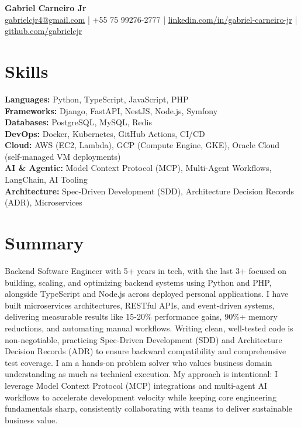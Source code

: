 \documentclass[letterpaper,10pt]{article}
\begin{document}
\begin{center}
    \textbf{\huge Gabriel Carneiro Jr} \\ \vspace{2pt}
    \small
    \href{mailto:gabrielcjr4@gmail.com}{gabrielcjr4@gmail.com} |
    +55 75 99276-2777 |
    \href{https://www.linkedin.com/in/gabriel-carneiro-jr}{linkedin.com/in/gabriel-carneiro-jr} |
    \href{https://github.com/gabrielcjr}{github.com/gabrielcjr}
\end{center}

\section{Skills}
\begin{itemize}[leftmargin=0.15in, label={}]
  \small{\item{
    \textbf{Languages:} Python, TypeScript, JavaScript, PHP \\
    \textbf{Frameworks:} Django, FastAPI, NestJS, Node.js, Symfony \\
    \textbf{Databases:} PostgreSQL, MySQL, Redis \\
    \textbf{DevOps:} Docker, Kubernetes, GitHub Actions, CI/CD \\
    \textbf{Cloud:} AWS (EC2, Lambda), GCP (Compute Engine, GKE), Oracle Cloud (self-managed VM deployments) \\
    \textbf{AI \& Agentic:} Model Context Protocol (MCP), Multi-Agent Workflows, LangChain, AI Tooling \\
    \textbf{Architecture:} Spec-Driven Development (SDD), Architecture Decision Records (ADR), Microservices
  }}
\end{itemize}

\section{Summary}
\small{Backend Software Engineer with 5+ years in tech, with the last 3+ focused on building, scaling, and optimizing backend systems using Python and PHP, alongside TypeScript and Node.js across deployed personal applications. I have built microservices architectures, RESTful APIs, and event-driven systems, delivering measurable results like 15-20\% performance gains, 90\%+ memory reductions, and automating manual workflows. Writing clean, well-tested code is non-negotiable, practicing Spec-Driven Development (SDD) and Architecture Decision Records (ADR) to ensure backward compatibility and comprehensive test coverage. I am a hands-on problem solver who values business domain understanding as much as technical execution. My approach is intentional: I leverage Model Context Protocol (MCP) integrations and multi-agent AI workflows to accelerate development velocity while keeping core engineering fundamentals sharp, consistently collaborating with teams to deliver sustainable business value.}
\end{document}
